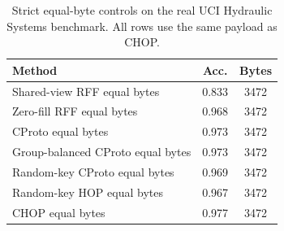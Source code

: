 \begin{table}[t]
\centering
\caption{Strict equal-byte controls on the real UCI Hydraulic Systems benchmark. All rows use the same payload as CHOP.}
\label{tab:strict-equal-byte-hydraulic}
\begin{tabular}{lcc}
\toprule
Method & Acc. & Bytes \\
\midrule
Shared-view RFF equal bytes & 0.833 & 3472 \\
Zero-fill RFF equal bytes & 0.968 & 3472 \\
CProto equal bytes & 0.973 & 3472 \\
Group-balanced CProto equal bytes & 0.973 & 3472 \\
Random-key CProto equal bytes & 0.969 & 3472 \\
Random-key HOP equal bytes & 0.967 & 3472 \\
CHOP equal bytes & 0.977 & 3472 \\
\bottomrule
\end{tabular}
\end{table}
